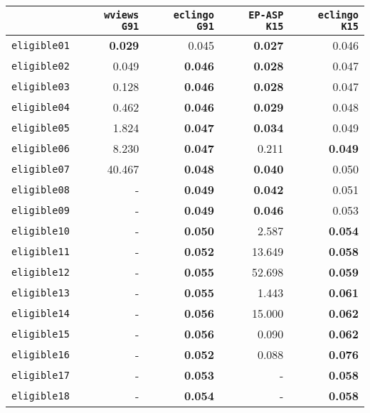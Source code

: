 \documentclass{new_tlp}
\def\\wviews{{\tt \wviews}}
\def\wviews{{\tt wviews}}
\def\EPASP{{\tt EP-ASP}}
\begin{document}
\begin{table}[ht]
    \begin{tabular}{c|rr|rr}
    \hline
    & \texttt{\wviews{} G91} & \texttt{eclingo G91} & \texttt{\EPASP{} K15} & \texttt{eclingo K15} \\ \hline
    \texttt{eligible01} & {\bf 0.029}      & 0.045       & {\bf 0.027}      & 0.046       \\
    \texttt{eligible02} & 0.049      & {\bf 0.046}       & {\bf 0.028}      & 0.047       \\
    \texttt{eligible03} & 0.128      & {\bf 0.046}       & {\bf 0.028}      & 0.047       \\
    \texttt{eligible04} & 0.462      & {\bf 0.046}       & {\bf 0.029}      & 0.048       \\
    \texttt{eligible05} & 1.824      & {\bf 0.047}       & {\bf 0.034}      & 0.049       \\
    \texttt{eligible06} & 8.230      & {\bf 0.047}       & 0.211      & {\bf 0.049}       \\
    \texttt{eligible07} & 40.467     & {\bf 0.048}       & {\bf 0.040}      & 0.050       \\
    \texttt{eligible08} & -          & {\bf 0.049}       & {\bf 0.042}      & 0.051       \\
    \texttt{eligible09} & -          & {\bf 0.049}       & {\bf 0.046}       & 0.053       \\
    \texttt{eligible10} & -          & {\bf 0.050}       & 2.587      & {\bf 0.054}       \\
    \texttt{eligible11} & -          & {\bf 0.052}       & 13.649     & {\bf 0.058}       \\
    \texttt{eligible12} & -          & {\bf 0.055}       & 52.698     & {\bf 0.059}       \\
    \texttt{eligible13} & -          & {\bf 0.055}       & 1.443      & {\bf 0.061}       \\
    \texttt{eligible14} & -          & {\bf 0.056}       & 15.000     & {\bf 0.062}      \\
    \texttt{eligible15} & -          & {\bf 0.056}       & 0.090      & {\bf 0.062}       \\
    \texttt{eligible16} & -          & {\bf 0.052}       & 0.088      & {\bf 0.076}       \\
    \texttt{eligible17} & -          & {\bf 0.053}       & -          & {\bf 0.058}       \\
    \texttt{eligible18} & -          & {\bf 0.054}       & -          & {\bf 0.058}       \\

\end{tabular}
\end{table}
\end{document}
